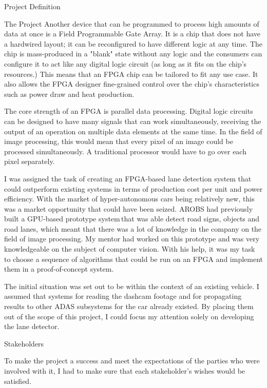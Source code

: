 \documentclass{matthijs}
\begin{document}
\begin{hoofdstuk}{Project Definition}
\begin{paragraaf}{The Project}
			Another device that can be programmed to process high amounts of data at once is a Field Programmable Gate Array.
			It is a chip that does not have a hardwired layout; it can be reconfigured to have different logic at any time.
			The chip is mass-produced in a "blank" state without any logic and the consumers can configure it to act like any digital logic circuit (as long as it fits on the chip's resources.)
			This means that an FPGA chip can be tailored to fit any use case.
			It also allows the FPGA designer fine-grained control over the chip's characteristics such as power draw and heat production.

			The core strength of an FPGA is parallel data processing.
			Digital logic circuits can be designed to have many signals that can work simultaneously, receiving the output of an operation on multiple data elements at the same time.
			In the field of image processing, this would mean that every pixel of an image could be processed simultaneously.
			A traditional processor would have to go over each pixel separately.

			I was assigned the task of creating an FPGA-based lane detection system that could outperform existing systems in terms of production cost per unit and power efficiency.
			With the market of hyper-autonomous cars being relatively new, this was a market opportunity that could have been seized.
			AROBS had previously built a GPU-based prototype system\,that was able detect road signs, objects and road lanes, which meant that there was a lot of knowledge in the company on the field of image processing.
			My mentor had worked on this prototype and was very knowledgeable on the subject of computer vision.
			With his help, it was my task to choose a sequence of algorithms that could be run on an FPGA and implement them in a proof-of-concept system.

			The initial situation was set out to be within the context of an existing vehicle.
			I assumed that systems for reading the dashcam footage and for propagating results to other ADAS subsystems for the car already existed.
			By placing them out of the scope of this project, I could focus my attention solely on developing the lane detector.

		\end{paragraaf}

		\begin{paragraaf}{Stakeholders}

			To make the project a success and meet the expectations of the parties who were involved with it, I had to make sure that each stakeholder's wishes would be satisfied.


\end{paragraaf}
\end{hoofdstuk}
\end{document}
